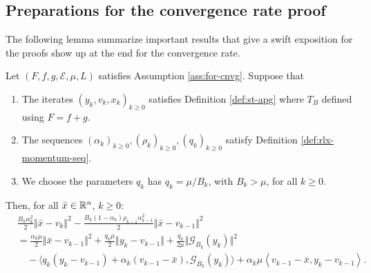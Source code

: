 \documentclass[12pt]{article}
\begin{document}
    \subsection{Preparations for the convergence rate proof}
        The following lemma summarize important results that give a swift exposition for the proofs show up at the end for the convergence rate. 
        \begin{lemma}\label{lemma:cnvg-prep-part1}
            Let $(F, f, g,  \mathcal E, \mu, L)$ satisfies Assumption \ref{ass:for-cnvg}. 
            Suppose that 
            \begin{enumerate}[nosep]
                \item The iterates $(y_k, v_k, x_k)_{k \ge 0}$ satisfies Definition \ref{def:st-apg} where $T_B$ defined using $F = f + g$. 
                \item The sequences $(\alpha_k)_{k\ge 0}, (\rho_{k})_{k \ge 0}, (q_k)_{k \ge 0}$ satisfy Definition \ref{def:rlx-momentum-seq}. 
                \item We choose the parameters $q_k$ has $q_k = \mu/B_k$, with $B_k > \mu$, for all $k \ge 0$. 
            \end{enumerate}
            Then, for all $\bar x \in \mathbb R^n$, $k \ge 0$: 
            \begin{align*}
                & \frac{B_k\alpha_k^2}{2}\Vert \bar x - v_k\Vert^2 
                -\frac{B_k(1 - \alpha_k)\rho_{k - 1}\alpha_{k - 1}^2}{2}\Vert \bar x - v_{k - 1}\Vert^2
                \\
                &=
                \frac{\alpha_k \mu}{2}
                \Vert \bar x - v_{k - 1}\Vert^2
                + \frac{q_k\mu}{2}\Vert y_k - v_{k - 1} \Vert
                + \frac{q_k}{2\mu}\Vert \mathcal G_{B_k}(y_k)\Vert^2
                \\ &\quad 
                - \langle
                    q_k(y_k - v_{k - 1}) + \alpha_k(v_{k - 1} - \bar x), \mathcal G_{B_k}(y_k)
                \rangle
                    + \alpha_k \mu
                    \left\langle 
                        v_{k - 1} - \bar x, 
                        y_k - v_{k - 1}
                    \right\rangle. 
            \end{align*}
        \end{lemma}
\end{document}
